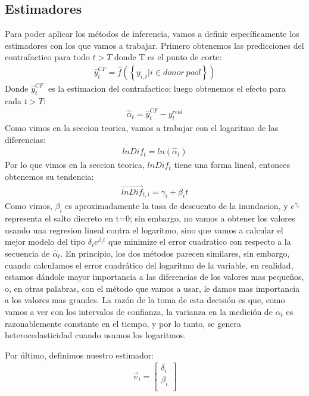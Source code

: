 \documentclass[12pt]{article}
\begin{document}
\subsection{Estimadores}
Para poder aplicar los métodos de inferencia, vamos a definir específicamente los estimadores con los que vamos a trabajar.
Primero obtenemos las predicciones del contrafactico para todo {$ t > T $} donde T es el punto de corte:
\begin{align*}
    {\hat{y}}_t^{CF}=\hat{f}\left(\left\{y_{i,t}|i\in d o n o r\ pool\right\}\right)
\end{align*}
Donde {${\hat{y}}_t^{CF}\ $} es la estimacion del contrafactico; luego obtenemos el efecto para cada {$ t > T $}:
\begin{align*}
    {\hat{\alpha}}_t={\hat{y}}_t^{CF}-y_t^{real}
\end{align*}
Como vimos en la seccion teorica, vamos a trabajar con el logaritmo de las diferencias:
\begin{align*}
    {lnDif}_t=ln\left({\hat{\alpha}}_t\right)
\end{align*}
Por lo que vimos en la seccion teorica, {$ {lnDif}_t $} tiene una forma lineal, entonces obtenemos su tendencia:
\begin{align*}
    {\vec{lnDif}}_{t,i}=\gamma_i+\beta_it
\end{align*}
Como vimos, {$ \beta_i $} es aproximadamente la tasa de descuento de la inundacion, y  {$ e^{\gamma_i} $} representa el salto discreto en t=0; sin embargo, no vamos a obtener los valores usando una regresion lineal contra el logaritmo, sino que vamos a calcular el mejor modelo del tipo  {$ \delta_ie^{\beta_it} $} que minimize el error cuadratico con respecto a la secuencia de  {$ {\hat{\alpha}}_t $}. En principio, los dos métodos parecen similares, sin embargo, cuando calculamos el error cuadrático del logaritmo de la variable, en realidad, estamos dándole mayor importancia a las diferencias de los valores mas pequeños, o, en otras palabras, con el método que vamos a usar, le damos mas importancia a los valores mas grandes. La razón de la toma de esta decisión es que, como vamos a ver con los intervalos de confianza, la varianza en la medición de  {$ {\hat{\alpha}}_t $} es razonablemente constante en el tiempo, y por lo tanto, se genera heterocedasticidad cuando usamos los logaritmos.


Por último, definimos nuestro estimador:
\begin{align*}
    {\vec{v}}_i=\left[\begin{matrix}\delta_i\\\beta_i\\\end{matrix}\right]
\end{align*}
\pagebreak
\end{document}
